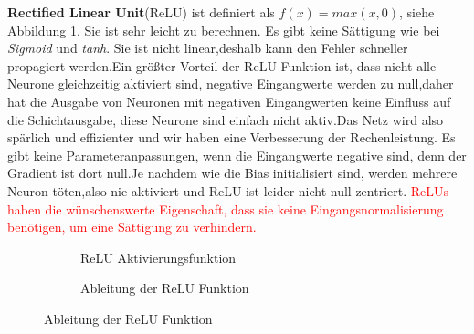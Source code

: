 \documentclass[12pt,a4paper]{scrartcl}
\numberwithin{equation}{section}
\begin{document}
	\textbf{Rectified Linear Unit}(ReLU) ist definiert als $f(x)= max(x,0) $, siehe Abbildung \ref{fig:relu}. Sie ist sehr leicht zu berechnen. Es gibt keine Sättigung wie bei \textit{Sigmoid} und \textit{tanh}. Sie ist nicht linear,deshalb kann den Fehler schneller propagiert werden.Ein größter Vorteil der ReLU-Funktion ist, dass nicht alle Neurone gleichzeitig aktiviert sind, negative Eingangwerte werden zu null,daher hat die Ausgabe von Neuronen mit negativen Eingangwerten keine Einfluss auf die Schichtausgabe, diese Neurone sind einfach nicht aktiv.Das Netz wird also spärlich und effizienter und wir haben eine Verbesserung der Rechenleistung.
	Es gibt keine Parameteranpassungen, wenn die Eingangwerte negative sind, denn der Gradient ist dort null.Je nachdem wie die Bias initialisiert sind, werden mehrere Neuron töten,also nie aktiviert und ReLU ist leider nicht null zentriert. \textcolor{red}{ReLUs haben die wünschenswerte Eigenschaft, dass sie keine Eingangsnormalisierung benötigen, um eine Sättigung zu verhindern.}
		\begin{figure}[h]
			\caption{ReLU Aktivierungsfunktion}
		\begin{subfigure}{.5\textwidth}
			\centering
			\caption{ReLU Aktivierungsfunktion}

		\end{subfigure}%
		\begin{subfigure}{.5\textwidth}
			\centering
			\caption{Ableitung der ReLU Funktion}
			
		\end{subfigure}
		\label{fig:relu}
	\end{figure}
	
\end{document}
